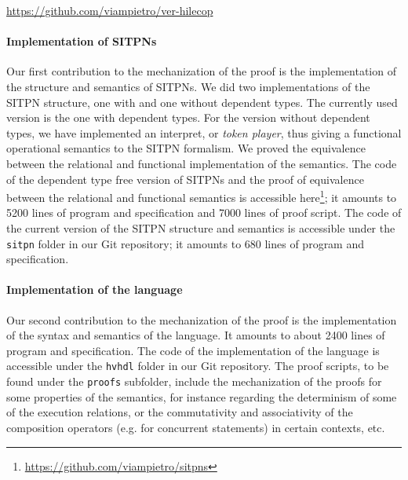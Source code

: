 \documentclass[pdflatex,sn-mathphys]{sn-jnl}%
\theoremstyle{thmstyleone}%
\theoremstyle{thmstyletwo}%
\theoremstyle{thmstylethree}%
\begin{document}
\begin{center}
  \url{https://github.com/viampietro/ver-hilecop}
\end{center}

\paragraph{Implementation of SITPNs}

% 
%

Our first contribution to the mechanization of the proof is the
implementation of the structure and semantics of SITPNs.  We did two
implementations of the SITPN structure, one with and one without
dependent types. The currently used version is the one with dependent
types.  For the version without dependent types, we have implemented
an interpret, or \textit{token player}, thus giving a functional
operational semantics to the SITPN formalism. We proved the
equivalence between the relational and functional implementation of
the semantics. The code of the dependent type free version of SITPNs
and the proof of equivalence between the relational and functional
semantics is accessible
here\footnote{\url{https://github.com/viampietro/sitpns}}; it amounts
to 5200 lines of program and specification and 7000 lines of proof
script. The code of the current version of the SITPN structure and
semantics is accessible under the \texttt{sitpn} folder in our
\textsf{Git} repository; it amounts to 680 lines of program and
specification.

\paragraph{Implementation of the \hvhdl{} language}

% 
%

Our second contribution to the mechanization of the proof is the
implementation of the syntax and semantics of the \hvhdl{} language.
It amounts to about 2400 lines of program and specification. The code
of the implementation of the \hvhdl{} language is accessible under the
\texttt{hvhdl} folder in our \textsf{Git} repository. The proof
scripts, to be found under the \texttt{proofs} subfolder, include the
mechanization of the proofs for some properties of the \hvhdl{}
semantics, for instance regarding the determinism of some of the
execution relations, or the commutativity and associativity of the
composition operators (e.g. for concurrent statements) in certain
contexts, etc.
\end{document}
